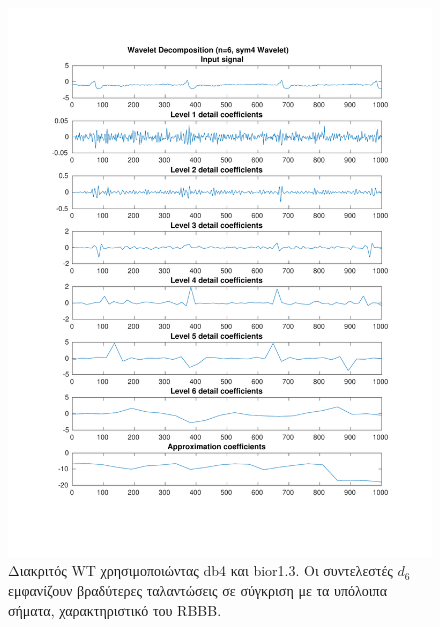 \documentclass[11pt,a4paper]{article}
\begin{document}
\begin{figure}[H]
\begin{minipage}{0.48\textwidth}
	\includegraphics[width=\textwidth]{fig/118l1_dwt2.pdf}
\end{minipage}
\vfill
\caption{Διακριτός WT χρησιμοποιώντας db4 και bior1.3. Οι συντελεστές $d_6$ εμφανίζουν βραδύτερες ταλαντώσεις σε σύγκριση με τα υπόλοιπα σήματα, χαρακτηριστικό του RBBB.}
\label{fig:118l1_dwt}
\end{figure}
\end{document}
